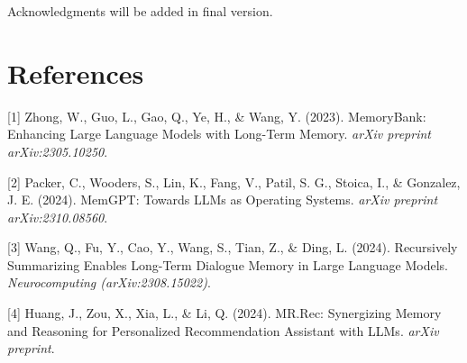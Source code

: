 \documentclass{article}
\begin{document}
\begin{ack}
Acknowledgments will be added in final version.
\end{ack}

\section*{References}

\small

[1] Zhong, W., Guo, L., Gao, Q., Ye, H., \& Wang, Y. (2023). MemoryBank: Enhancing Large Language Models with Long-Term Memory. \textit{arXiv preprint arXiv:2305.10250}.
\label{zhong2023memorybank}

[2] Packer, C., Wooders, S., Lin, K., Fang, V., Patil, S. G., Stoica, I., \& Gonzalez, J. E. (2024). MemGPT: Towards LLMs as Operating Systems. \textit{arXiv preprint arXiv:2310.08560}.
\label{packer2024memgpt}

[3] Wang, Q., Fu, Y., Cao, Y., Wang, S., Tian, Z., \& Ding, L. (2024). Recursively Summarizing Enables Long-Term Dialogue Memory in Large Language Models. \textit{Neurocomputing (arXiv:2308.15022)}.
\label{wang2024recursively}

[4] Huang, J., Zou, X., Xia, L., \& Li, Q. (2024). MR.Rec: Synergizing Memory and Reasoning for Personalized Recommendation Assistant with LLMs. \textit{arXiv preprint}.
\label{huang2024mrrec}
\end{document}

